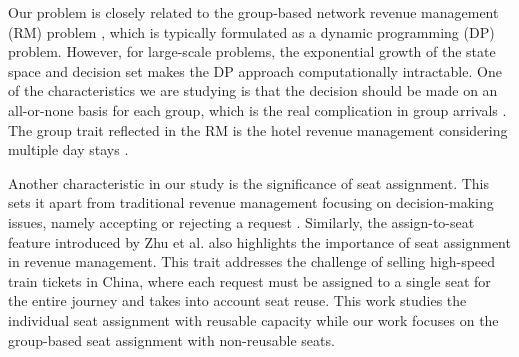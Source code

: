 
Our problem is closely related to the group-based network revenue management (RM) problem \cite{williamson1992airline}, which is typically formulated as a dynamic programming (DP) problem. However, for large-scale problems, the exponential growth of the state space and decision set makes the DP approach computationally intractable. One of the characteristics we are studying is that the decision should be made on an all-or-none basis for each group, which is the real complication in group arrivals \cite{talluri2006theory}. The group trait reflected in the RM is the hotel revenue management considering multiple day stays \cite{aydin2018decomposition, bitran1995application}. 


Another characteristic in our study is the significance of seat assignment. This sets it apart from traditional revenue management focusing on decision-making issues, namely accepting or rejecting a request \cite{gallego1997multiproduct}. Similarly, the assign-to-seat feature introduced by Zhu et al. \cite{zhu2023assign} also highlights the importance of seat assignment in revenue management. This trait addresses the challenge of selling high-speed train tickets in China, where each request must be assigned to a single seat for the entire journey and takes into account seat reuse. This work studies the individual seat assignment with reusable capacity while our work focuses on the group-based seat assignment with non-reusable seats.









